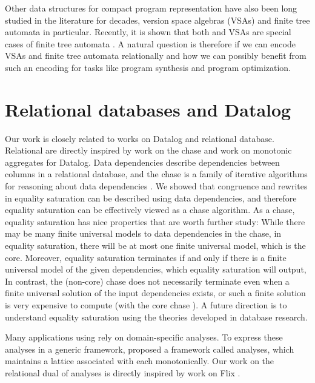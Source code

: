 Other data structures for compact program representation 
 have also been long studied in the literature for decades,
 version space algebras (VSAs) \citep{vsa,flashmeta} 
 and finite tree automata \citep{blaze, dace} in particular.
Recently, it is shown that both \egraphs and VSAs are special cases of finite tree automata \citep{vsa-eq-fta}.
A natural question is therefore if we can encode VSAs and finite tree automata relationally
 and how we can possibly benefit from such an encoding for tasks 
 like program synthesis and program optimization.

\section{Relational databases and Datalog}

Our work is closely related to works on Datalog and relational database.
Relational \egraphs are directly inspired by work on the chase 
 and work on monotonic aggregates for Datalog.
Data dependencies describe dependencies between columns in a relational database, 
 and the chase is a family of iterative algorithms
 for reasoning about data dependencies \citep{chase-revisited, bench-chase}.
We showed that congruence and rewrites in equality saturation 
 can be described using data dependencies, 
 and therefore equality saturation can be effectively viewed as a chase algorithm.
As a chase, equality saturation has nice properties that are worth further study:
While there may be many finite universal models to data dependencies in the chase,
 in equality saturation,
 there will be at most one finite universal model, 
 which is the core.
Moreover,
 equality saturation terminates 
 if and only if there is a finite universal model of the given dependencies, 
 which equality saturation will output,
In contrast,
 the (non-core) chase does not necessarily terminate 
 even when a finite universal solution of the input dependencies exists,
 or such a finite solution is very expensive to compute (with the core chase \citep{chase-revisited}).
A future direction is 
 to understand equality saturation using the theories developed 
 in database research.

Many applications using \egraphs rely on domain-specific analyses.
To express these analyses in a generic \egraph framework, 
 \egg proposed a framework called \eclass analyses, 
 which maintains a lattice associated with each \eclass monotonically.
Our work on the relational dual of \eclass analyses 
 is directly inspired by work on Flix \citep{flix}.

